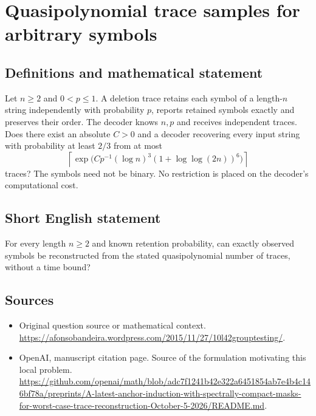 \documentclass[11pt]{article}
\begin{document}
\section*{Quasipolynomial trace samples for arbitrary symbols}\label{30007459}
\subsection{Definitions and mathematical statement}
Let $n\ge2$ and $0<p\le1$. A deletion trace retains each symbol of a length-$n$ string independently with probability $p$, reports retained symbols exactly and preserves their order. The decoder knows $n,p$ and receives independent traces. Does there exist an absolute $C>0$ and a decoder recovering every input string with probability at least $2/3$ from at most
\[
 \left\lceil\exp\bigl(Cp^{-1}(\log n)^3(1+\log\log(2n))^6\bigr)\right\rceil
\]
traces? The symbols need not be binary. No restriction is placed on the decoder's computational cost.

\subsection{Short English statement}
For every length $n\ge2$ and known retention probability, can exactly observed symbols be reconstructed from the stated quasipolynomial number of traces, without a time bound?

\subsection{Sources}
\begin{itemize}
\item[S1] Original question source or mathematical context.
\url{https://afonsobandeira.wordpress.com/2015/11/27/10l42grouptesting/}.
\item[S2] OpenAI, manuscript citation page. Source of the formulation motivating this local problem.
\url{https://github.com/openai/math/blob/adc7f1241b42e322a6451854ab7e4b4c146bf78a/preprints/A-latest-anchor-induction-with-spectrally-compact-masks-for-worst-case-trace-reconstruction-October-5-2026/README.md}.
\end{itemize}
\end{document}
